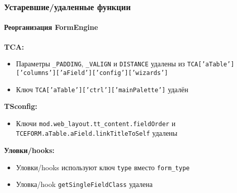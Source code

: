 \begin{frame}[fragile]
	\frametitle{Устаревшие/удаленные функции}
	\framesubtitle{Реорганизация FormEngine}

		\textbf{TCA:}

			\small
			\begin{itemize}

				\item Параметры \texttt{\_PADDING}, \texttt{\_VALIGN} и \texttt{DISTANCE}
					удалены из
					\texttt{TCA['aTable']['columns']['aField']['config']['wizards']}

				\item Ключ \texttt{TCA['aTable']['ctrl']['mainPalette']} удалён

			\end{itemize}

		\textbf{TSconfig:}

			\small
			\begin{itemize}
				\item Ключи \texttt{mod.web\_layout.tt\_content.fieldOrder} и
					\texttt{TCEFORM.aTable.aField.linkTitleToSelf} удалены
			\end{itemize}

		\textbf{Уловки/hooks:}

			\small
			\begin{itemize}
				\item Уловки/hooks используют ключ \texttt{type} вместо \texttt{form\_type}
				\item Уловка/hook \texttt{getSingleFieldClass} удалена
			\end{itemize}

\end{frame}


